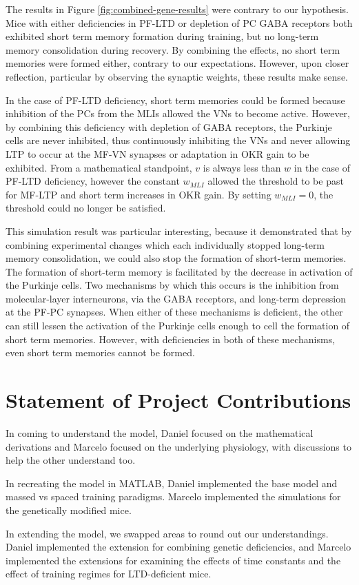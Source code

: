\documentclass[10pt]{article}
\begin{document}
The results in Figure \ref{fig:combined-gene-results} were contrary to our hypothesis. Mice with either deficiencies in PF-LTD or depletion of PC GABA receptors both exhibited short term memory formation during training, but no long-term memory consolidation during recovery. By combining the effects, no short term memories were formed either, contrary to our expectations. However, upon closer reflection, particular by observing the synaptic weights, these results make sense.

In the case of PF-LTD deficiency, short term memories could be formed because inhibition of the PCs from the MLIs allowed the VNs to become active. However, by combining this deficiency with depletion of GABA receptors, the Purkinje cells are never inhibited, thus continuously inhibiting the VNs and never allowing LTP to occur at the MF-VN synapses or adaptation in OKR gain to be exhibited. From a mathematical standpoint, \(v\) is always less than \(w\) in the case of PF-LTD deficiency, however the constant \(w_{MLI}\) allowed the threshold to be past for MF-LTP and short term increases in OKR gain. By setting \(w_{MLI}=0\), the threshold could no longer be satisfied.

This simulation result was particular interesting, because it demonstrated that by combining experimental changes which each individually stopped long-term memory consolidation, we could also stop the formation of short-term memories. The formation of short-term memory is facilitated by the decrease in activation of the Purkinje cells. Two mechanisms by which this occurs is the inhibition from molecular-layer interneurons, via the GABA receptors, and long-term depression at the PF-PC synapses. When either of these mechanisms is deficient, the other can still lessen the activation of the Purkinje cells enough to cell the formation of short term memories. However, with deficiencies in both of these mechanisms, even short term memories cannot be formed.

\section{Statement of Project Contributions}

In coming to understand the model, Daniel focused on the mathematical derivations and Marcelo focused on the underlying physiology, with discussions to help the other understand too.

In recreating the model in MATLAB, Daniel implemented the base model and massed vs spaced training paradigms. Marcelo implemented the simulations for the genetically modified mice.

In extending the model, we swapped areas to round out our understandings. Daniel implemented the extension for combining genetic deficiencies, and Marcelo implemented the extensions for examining the effects of time constants and the effect of training regimes for LTD-deficient mice.



\end{document}
